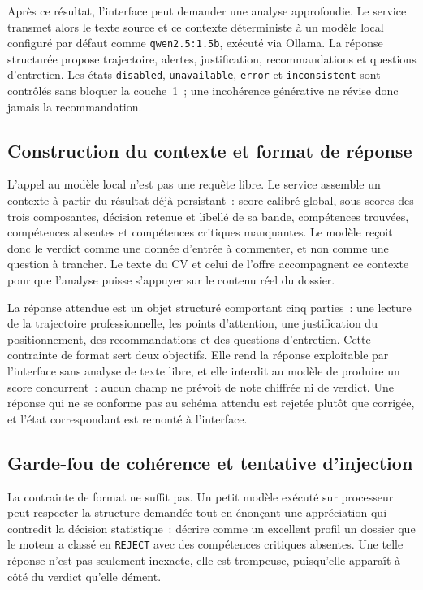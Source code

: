 Après ce résultat, l'interface peut demander une analyse approfondie. Le service transmet alors le texte source et ce contexte déterministe à un modèle local configuré par défaut comme \texttt{qwen2.5:1.5b}, exécuté via Ollama. La réponse structurée propose trajectoire, alertes, justification, recommandations et questions d'entretien. Les états \texttt{disabled}, \texttt{unavailable}, \texttt{error} et \texttt{inconsistent} sont contrôlés sans bloquer la couche~1~; une incohérence générative ne révise donc jamais la recommandation.

\subsection{Construction du contexte et format de réponse}

L'appel au modèle local n'est pas une requête libre. Le service assemble un contexte à partir du résultat déjà persistant~: score calibré global, sous-scores des trois composantes, décision retenue et libellé de sa bande, compétences trouvées, compétences absentes et compétences critiques manquantes. Le modèle reçoit donc le verdict comme une donnée d'entrée à commenter, et non comme une question à trancher. Le texte du CV et celui de l'offre accompagnent ce contexte pour que l'analyse puisse s'appuyer sur le contenu réel du dossier.

La réponse attendue est un objet structuré comportant cinq parties~: une lecture de la trajectoire professionnelle, les points d'attention, une justification du positionnement, des recommandations et des questions d'entretien. Cette contrainte de format sert deux objectifs. Elle rend la réponse exploitable par l'interface sans analyse de texte libre, et elle interdit au modèle de produire un score concurrent~: aucun champ ne prévoit de note chiffrée ni de verdict. Une réponse qui ne se conforme pas au schéma attendu est rejetée plutôt que corrigée, et l'état correspondant est remonté à l'interface.

\subsection{Garde-fou de cohérence et tentative d'injection}

La contrainte de format ne suffit pas. Un petit modèle exécuté sur processeur peut respecter la structure demandée tout en énonçant une appréciation qui contredit la décision statistique~: décrire comme un excellent profil un dossier que le moteur a classé en \texttt{REJECT} avec des compétences critiques absentes. Une telle réponse n'est pas seulement inexacte, elle est trompeuse, puisqu'elle apparaît à côté du verdict qu'elle dément.


